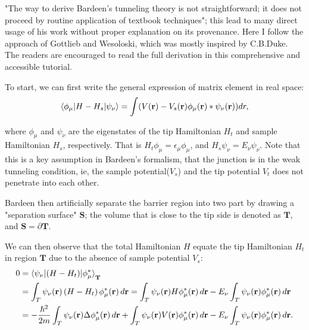 "The way to derive Bardeen's tunneling theory is not straightforward; it does not proceed by routine application of textbook techniques"\cite{gottliebBardeensTunnelingTheory}; this lead to many direct usage of his work without proper explanation on its provenance. Here I follow the approach of Gottlieb and Wesoloski\cite{gottliebBardeensTunnelingTheory}, which was mostly inspired by C.B.Duke\cite{dukeTunnelingSolids1973}. The readers are encouraged to read the full derivation in this comprehensive and accessible tutorial\cite{gottliebBardeensTunnelingTheory}. 

To start, we can first write the general expression of matrix element in real space: 
\begin{equation}
	\label{eq:bardeen_1}
	\braket{\phi_{\mu}|H-H_s|\psi_{\nu}} = \int(V(\mathbf{r})- V_s(\mathbf{r})\phi_{\mu}(\mathbf{r})*\psi_{\nu}(\mathbf{r}))dr,
\end{equation}

where $\phi_{\mu}$ and $\psi_{\nu}$ are the eigenstates of the tip Hamiltonian $H_t$ and sample Hamiltonian $H_s$, respectively. That is $H_t \phi_{\mu} = \epsilon_{\mu} \phi_{\mu}$, and $H_s \psi_{\nu} = E_{\nu} \psi_{\nu}$. Note that this is a key assumption in Bardeen's formalism, that the junction is in the weak tunneling condition, ie, the sample potential($V_s$) and the tip potential $V_t$ does not penetrate into each other. 

Bardeen then artificially separate the barrier region into two part by drawing a "separation surface" $\mathbf{S}$; the volume that is close to the tip side is denoted as $\mathbf{T}$, and $\mathbf{S} = \partial \mathbf{T}$.

We can then observe that the total Hamiltonian $H$ equate the tip Hamiltonian $H_t$ in region $\mathbf{T}$ due to the absence of sample potential $V_s$: 
\begin{equation}
	\label{eq:bardeen_2}
	\begin{aligned}
		0 &= \braket{\psi_{\nu}|(H-H_t)|\phi_{\mu}^*}_{\mathbf{T}}\\
		 &= \int_{T} \psi_{\nu}(\mathbf{r}) \left( H - H_{t} \right) \phi_{\mu}^*(\mathbf{r}) \, d\mathbf{r} 
		= \int_{T} \psi_{\nu}(\mathbf{r}) H \phi_{\mu}^*(\mathbf{r}) \, d\mathbf{r} 
		- E_{\nu} \int_{T} \psi_{\nu}(\mathbf{r}) \phi_{\mu}^*(\mathbf{r}) \, d\mathbf{r} \\
		&= -\frac{\hslash^2}{2m} \int_{T} \psi_{\nu}(\mathbf{r}) \Delta \phi_{\mu}^*(\mathbf{r}) \, d\mathbf{r} 
		+ \int_{T} \psi_{\nu}(\mathbf{r}) V(\mathbf{r}) \phi_{\mu}^*(\mathbf{r}) \, d\mathbf{r} 
		- E_{\nu} \int_{T} \psi_{\nu}(\mathbf{r}) \phi_{\mu}^*(\mathbf{r}) \, d\mathbf{r}.
	\end{aligned}
\end{equation}

